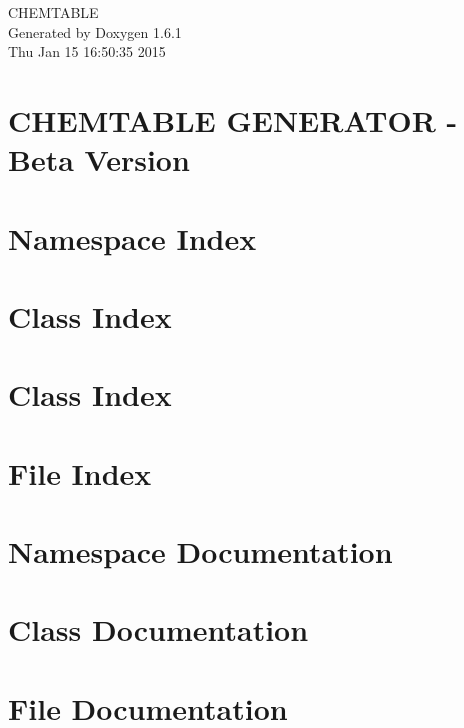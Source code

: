 \documentclass[a4paper]{book}
\begin{document}
\hypersetup{pageanchor=false}
\begin{titlepage}
\vspace*{7cm}
\begin{center}
{\Large CHEMTABLE }\\
\vspace*{1cm}
{\large Generated by Doxygen 1.6.1}\\
\vspace*{0.5cm}
{\small Thu Jan 15 16:50:35 2015}\\
\end{center}
\end{titlepage}
\clearemptydoublepage
{}
\tableofcontents
\clearemptydoublepage
{}
\hypersetup{pageanchor=true}
\chapter{CHEMTABLE GENERATOR -\/ Beta Version}
\label{index}\hypertarget{index}{}
\chapter{Namespace Index}

\chapter{Class Index}

\chapter{Class Index}

\chapter{File Index}

\chapter{Namespace Documentation}




\chapter{Class Documentation}




























\chapter{File Documentation}


\printindex
\end{document}
